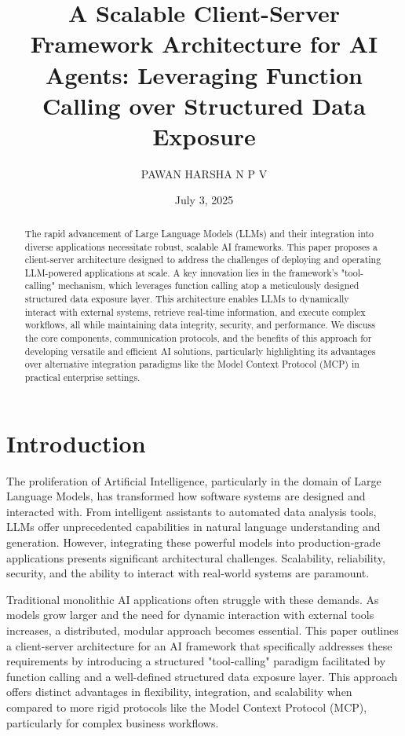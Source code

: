 \documentclass[10pt, a4paper]{article}
\title{A Scalable Client-Server Framework Architecture for AI Agents: Leveraging Function Calling over Structured Data Exposure}
\author{PAWAN HARSHA N P V}
\date{July 3, 2025}
\begin{document}
\maketitle

\begin{abstract}
The rapid advancement of Large Language Models (LLMs) and their integration into diverse applications necessitate robust, scalable AI frameworks. This paper proposes a client-server architecture designed to address the challenges of deploying and operating LLM-powered applications at scale. A key innovation lies in the framework's "tool-calling" mechanism, which leverages function calling atop a meticulously designed structured data exposure layer. This architecture enables LLMs to dynamically interact with external systems, retrieve real-time information, and execute complex workflows, all while maintaining data integrity, security, and performance. We discuss the core components, communication protocols, and the benefits of this approach for developing versatile and efficient AI solutions, particularly highlighting its advantages over alternative integration paradigms like the Model Context Protocol (MCP) in practical enterprise settings.
\end{abstract}

\section{Introduction}
The proliferation of Artificial Intelligence, particularly in the domain of Large Language Models, has transformed how software systems are designed and interacted with. From intelligent assistants to automated data analysis tools, LLMs offer unprecedented capabilities in natural language understanding and generation. However, integrating these powerful models into production-grade applications presents significant architectural challenges. Scalability, reliability, security, and the ability to interact with real-world systems are paramount.

Traditional monolithic AI applications often struggle with these demands. As models grow larger and the need for dynamic interaction with external tools increases, a distributed, modular approach becomes essential. This paper outlines a client-server architecture for an AI framework that specifically addresses these requirements by introducing a structured "tool-calling" paradigm facilitated by function calling and a well-defined structured data exposure layer. This approach offers distinct advantages in flexibility, integration, and scalability when compared to more rigid protocols like the Model Context Protocol (MCP), particularly for complex business workflows.
\end{document}
